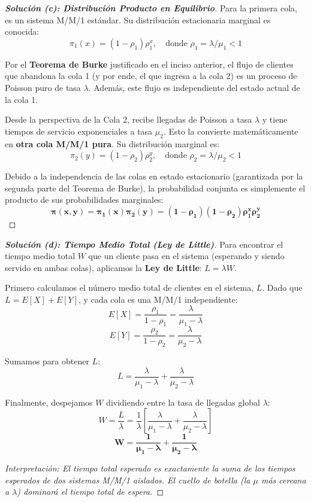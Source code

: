 \documentclass[10pt,a4paper]{article}
\begin{document}
\begin{proof}[\textbf{Solución (c): Distribución Producto en Equilibrio}]
    Para la primera cola, es un sistema M/M/1 estándar. Su distribución estacionaria marginal es conocida:
    \[ \pi_1(x) = (1 - \rho_1)\rho_1^x, \quad \text{donde } \rho_1 = \lambda / \mu_1 < 1 \]
    
    Por el \textbf{Teorema de Burke} justificado en el inciso anterior, el flujo de clientes que abandona la cola 1 (y por ende, el que ingresa a la cola 2) es un proceso de Poisson puro de tasa $\lambda$. Además, este flujo es independiente del estado actual de la cola 1.
    
    Desde la perspectiva de la Cola 2, recibe llegadas de Poisson a tasa $\lambda$ y tiene tiempos de servicio exponenciales a tasa $\mu_2$. Esto la convierte matemáticamente en \textbf{otra cola M/M/1 pura}. Su distribución marginal es:
    \[ \pi_2(y) = (1 - \rho_2)\rho_2^y, \quad \text{donde } \rho_2 = \lambda / \mu_2 < 1 \]
    
    Debido a la independencia de las colas en estado estacionario (garantizada por la segunda parte del Teorema de Burke), la probabilidad conjunta es simplemente el producto de sus probabilidades marginales:
    \[ \mathbf{\pi(x, y) = \pi_1(x) \pi_2(y) = (1 - \rho_1)(1 - \rho_2) \rho_1^x \rho_2^y} \]
\end{proof}

\vspace{5mm}

\begin{proof}[\textbf{Solución (d): Tiempo Medio Total (Ley de Little)}]
    Para encontrar el tiempo medio total $W$ que un cliente pasa en el sistema (esperando y siendo servido en ambas colas), aplicamos la \textbf{Ley de Little}: $L = \lambda W$.
    
    Primero calculamos el número medio total de clientes en el sistema, $L$. Dado que $L = E[X] + E[Y]$, y cada cola es una M/M/1 independiente:
    \[ E[X] = \frac{\rho_1}{1 - \rho_1} = \frac{\lambda}{\mu_1 - \lambda} \]
    \[ E[Y] = \frac{\rho_2}{1 - \rho_2} = \frac{\lambda}{\mu_2 - \lambda} \]
    
    Sumamos para obtener $L$:
    \[ L = \frac{\lambda}{\mu_1 - \lambda} + \frac{\lambda}{\mu_2 - \lambda} \]
    
    Finalmente, despejamos $W$ dividiendo entre la tasa de llegadas global $\lambda$:
    \[ W = \frac{L}{\lambda} = \frac{1}{\lambda} \left[ \frac{\lambda}{\mu_1 - \lambda} + \frac{\lambda}{\mu_2 - \lambda} \right] \]
    \[ \mathbf{W = \frac{1}{\mu_1 - \lambda} + \frac{1}{\mu_2 - \lambda}} \]
    
    \textit{Interpretación: El tiempo total esperado es exactamente la suma de los tiempos esperados de dos sistemas M/M/1 aislados. El cuello de botella (la $\mu$ más cercana a $\lambda$) dominará el tiempo total de espera.}
\end{proof}
\end{document}
